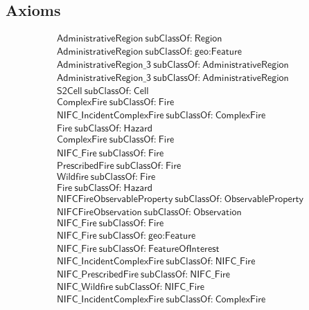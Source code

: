 \subsection{Axioms}
\begin{align}
  \textsf{AdministrativeRegion}~\textsf{subClassOf:}~\textsf{Region}\\
  \textsf{AdministrativeRegion}~\textsf{subClassOf:}~\textsf{geo:Feature}\\
  \textsf{AdministrativeRegion\_3}~\textsf{subClassOf:}~\textsf{AdministrativeRegion}\\
  \textsf{AdministrativeRegion\_3}~\textsf{subClassOf:}~\textsf{AdministrativeRegion}\\
  \textsf{S2Cell}~\textsf{subClassOf:}~\textsf{Cell}\\
  \textsf{ComplexFire}~\textsf{subClassOf:}~\textsf{Fire}\\
  \textsf{NIFC\_IncidentComplexFire}~\textsf{subClassOf:}~\textsf{ComplexFire}\\
  \textsf{Fire}~\textsf{subClassOf:}~\textsf{Hazard}\\
  \textsf{ComplexFire}~\textsf{subClassOf:}~\textsf{Fire}\\
  \textsf{NIFC\_Fire}~\textsf{subClassOf:}~\textsf{Fire}\\
  \textsf{PrescribedFire}~\textsf{subClassOf:}~\textsf{Fire}\\
  \textsf{Wildfire}~\textsf{subClassOf:}~\textsf{Fire}\\
  \textsf{Fire}~\textsf{subClassOf:}~\textsf{Hazard}\\
  \textsf{NIFCFireObservableProperty}~\textsf{subClassOf:}~\textsf{ObservableProperty}\\
  \textsf{NIFCFireObservation}~\textsf{subClassOf:}~\textsf{Observation}\\
  \textsf{NIFC\_Fire}~\textsf{subClassOf:}~\textsf{Fire}\\
  \textsf{NIFC\_Fire}~\textsf{subClassOf:}~\textsf{geo:Feature}\\
  \textsf{NIFC\_Fire}~\textsf{subClassOf:}~\textsf{FeatureOfInterest}\\
  \textsf{NIFC\_IncidentComplexFire}~\textsf{subClassOf:}~\textsf{NIFC\_Fire}\\
  \textsf{NIFC\_PrescribedFire}~\textsf{subClassOf:}~\textsf{NIFC\_Fire}\\
  \textsf{NIFC\_Wildfire}~\textsf{subClassOf:}~\textsf{NIFC\_Fire}\\
  \textsf{NIFC\_IncidentComplexFire}~\textsf{subClassOf:}~\textsf{ComplexFire}\\

\end{align}

